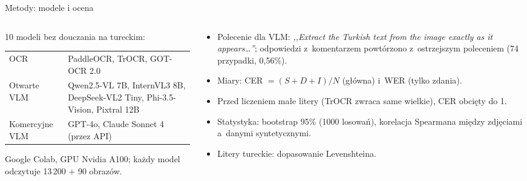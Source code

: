 \documentclass[aspectratio=169,11pt]{beamer}
\begin{document}
\begin{frame}{Metody: modele i ocena}
  \begin{columns}[T]
    \begin{column}{0.45\textwidth}
      \small
      10 modeli bez douczania na tureckim:

      \smallskip
      \begin{tabular}{@{}L{1.75cm}P{4.1cm}@{}}
        \toprule
        OCR & PaddleOCR, TrOCR, GOT-OCR 2.0 \\[2pt]
        Otwarte VLM & Qwen2.5-VL 7B, InternVL3 8B, DeepSeek-VL2 Tiny, Phi-3.5-Vision, Pixtral 12B \\[2pt]
        Komercyjne VLM & GPT-4o, Claude Sonnet 4 (przez API) \\
        \bottomrule
      \end{tabular}

      \medskip
      Google Colab, GPU Nvidia A100; każdy model odczytuje 13\,200 + 90 obrazów.
    \end{column}
    \begin{column}{0.52\textwidth}
      \small
      \begin{itemize}
        \item Polecenie dla VLM: \emph{,,Extract the Turkish text from the image exactly as it appears\ldots''};
          odpowiedzi z~komentarzem powtórzono z~ostrzejszym poleceniem (74 przypadki, 0,56\%).
        \item Miary: CER $=(S+D+I)/N$ (główna) i~WER (tylko zdania).
        \item Przed liczeniem małe litery (TrOCR zwraca same wielkie), CER obcięty do 1.
        \item Statystyka: bootstrap 95\% (1000 losowań), korelacja Spearmana między zdjęciami a~danymi syntetycznymi.
        \item Litery tureckie: dopasowanie Levenshteina.
      \end{itemize}
    \end{column}
  \end{columns}
\end{frame}
\end{document}
